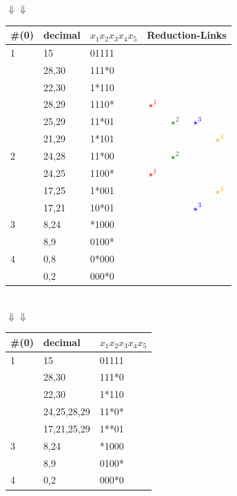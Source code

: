 \documentclass[10pt,a4paper]{scrartcl}
\begin{document}
\hspace*{3cm}$\Downarrow$\hspace*{3cm}$\Downarrow$\\
\hspace*{3.5mm}
\begin{tabular}{|l||l|l|l|l|l|l|}\hline
\#(0) & decimal & $x_1x_2x_3x_4x_5$ & \multicolumn{4}{c|}{Reduction-Links}                \\\hline\hline
1     & 15      & 01111             & &&&                                   \\
      & 28,30   & 111*0             & &&&              \\
      & 22,30   & 1*110             & &&&        \\
      & 28,29   & 1110*             & \textcolor{red}{$\star^1$}&&&        \\
      & 25,29   & 11*01             & &\textcolor{green}{$\star^2$}&\textcolor{blue}{$\star^3$}&        \\
      & 21,29   & 1*101             & &&&\textcolor{orange}{$\star^4$}                          \\\hline
2     & 24,28   & 11*00             & &\textcolor{green}{$\star^2$}&&                \\
      & 24,25   & 1100*             & \textcolor{red}{$\star^1$}&&&     \\
      & 17,25   & 1*001             & &&&\textcolor{orange}{$\star^4$}                 \\
      & 17,21   & 10*01             & &&\textcolor{blue}{$\star^3$}&                    \\\hline
3     & 8,24    & *1000             & &&&\\
      & 8,9     & 0100*             & &&&                       \\\hline
4     & 0,8     & 0*000             & &&&           \\
      & 0,2     & 000*0             & &&&           \\\hline
\end{tabular}\\
\hspace*{3cm}$\Downarrow$\hspace*{3cm}$\Downarrow$\\
\hspace*{3.5mm}
\begin{tabular}{|l||l|l|}\hline
\#(0) & decimal     & $x_1x_2x_3x_4x_5$    \\\hline\hline
1     & 15          & 01111                \\
      & 28,30       & 111*0                \\
      & 22,30       & 1*110                \\
      & 24,25,28,29 & 11*0*                \\
      & 17,21,25,29 & 1**01                \\\hline
3     & 8,24        & *1000                \\
      & 8,9         & 0100*                \\\hline
4     & 0,2         & 000*0                \\\hline
\end{tabular}\\
\end{document}

